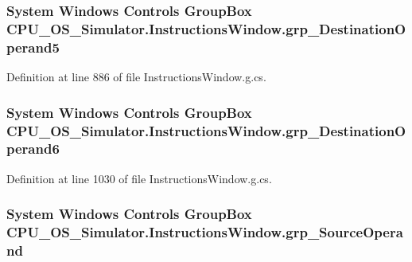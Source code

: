 \subsubsection[{grp\+\_\+\+Destination\+Operand5}]{\setlength{\rightskip}{0pt plus 5cm}System Windows Controls Group\+Box C\+P\+U\+\_\+\+O\+S\+\_\+\+Simulator.\+Instructions\+Window.\+grp\+\_\+\+Destination\+Operand5\hspace{0.3cm}{\ttfamily [package]}}\label{class_c_p_u___o_s___simulator_1_1_instructions_window_aa99ecad0d35bc5e70a8924c9b3913106}


Definition at line 886 of file Instructions\+Window.\+g.\+cs.

\hypertarget{class_c_p_u___o_s___simulator_1_1_instructions_window_a8e457b3503625b5e837320ad9eb439c6}{}
\subsubsection[{grp\+\_\+\+Destination\+Operand6}]{\setlength{\rightskip}{0pt plus 5cm}System Windows Controls Group\+Box C\+P\+U\+\_\+\+O\+S\+\_\+\+Simulator.\+Instructions\+Window.\+grp\+\_\+\+Destination\+Operand6\hspace{0.3cm}{\ttfamily [package]}}\label{class_c_p_u___o_s___simulator_1_1_instructions_window_a8e457b3503625b5e837320ad9eb439c6}


Definition at line 1030 of file Instructions\+Window.\+g.\+cs.

\hypertarget{class_c_p_u___o_s___simulator_1_1_instructions_window_ace26d2d0e3de3715d755e91ab04a054a}{}
\subsubsection[{grp\+\_\+\+Source\+Operand}]{\setlength{\rightskip}{0pt plus 5cm}System Windows Controls Group\+Box C\+P\+U\+\_\+\+O\+S\+\_\+\+Simulator.\+Instructions\+Window.\+grp\+\_\+\+Source\+Operand\hspace{0.3cm}{\ttfamily [package]}}\label{class_c_p_u___o_s___simulator_1_1_instructions_window_ace26d2d0e3de3715d755e91ab04a054a}


